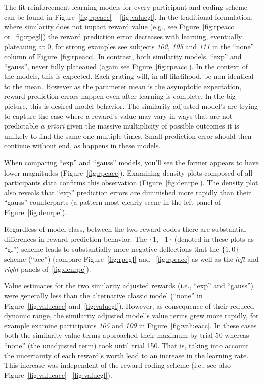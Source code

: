The fit reinforcement learning models for every participant and coding scheme can be found in Figure~\ref{fig:rpeacc} -~\ref{fig:valuegl}.  In the traditional formulation, where similarity does not impact reward value (e.g., see Figure~\ref{fig:rpeacc} or~\ref{fig:rpegl}) the reward prediction error decreases with learning, eventually plateauing at 0, for strong examples see subjects \emph{102}, \emph{105} and \emph{111} in the ``none'' column of Figure~\ref{fig:rpeacc}.  In contrast, both similarity models, ``exp'' and ``gauss'', never fully plateaued (again see Figure~\ref{fig:rpeacc}).  In the context of the models, this is expected.  Each grating will, in all likelihood, be non-identical to the mean. However as the parameter mean is the asymptotic expectation, reward prediction errors happen even after learning is complete.  In the big picture, this is desired model behavior.  The similarity adjusted model's are trying to capture the case where a reward's value may vary in ways that are not predictable \emph{a priori} given the massive multiplicity of possible outcomes it is unlikely to find the same one multiple times.  Small prediction error should then continue without end, as happens in these models.

When comparing ``exp'' and ``gauss'' models, you'll see the former appears to have lower magnitudes (Figure~\ref{fig:rpeacc}).  Examining density plots composed of all participants data confirms this observation (Figure~\ref{fig:denrpe}).  The density plot also reveals that ``exp'' prediction errors are diminished more rapidly than their ``gauss'' counterparts (a pattern most clearly scene in the left panel of Figure~\ref{fig:denrpe}).  

Regardless of model class, between the two reward codes there are substantial differences in reward prediction behavior.  The $\{1,-1\}$ (denoted in these plots as ``gl'') scheme leads to substantially more negative deflections that the $\{1,0\}$ scheme (``acc'') (compare Figure~\ref{fig:rpegl} and ~\ref{fig:rpeacc} as well as the \emph{left} and \emph{right} panels of~\ref{fig:denrpe}).   

Value estimates for the two similarity adjusted rewards (i.e., ``exp'' and ``gauss'') were generally less than the alternative classic model (``none'' in Figure~\ref{fig:valueacc} and~\ref{fig:valuegl}).  However, as consequence of their reduced dynamic range, the similarity adjusted model's value terms grew more rapidly, for example examine participants \emph{105} and \emph{109} in Figure~\ref{fig:valueacc}.  In these cases both the similarity value terms approached their maximum by trial 50 whereas ``none'' (the unadjusted term) took until trial 150.  That is, taking into account the uncertainty of each reward's worth lead to an increase in the learning rate.  This increase was independent of the reward coding scheme (i.e., see also Figure~\ref{fig:valueacc}-~\ref{fig:valuegl}).  

